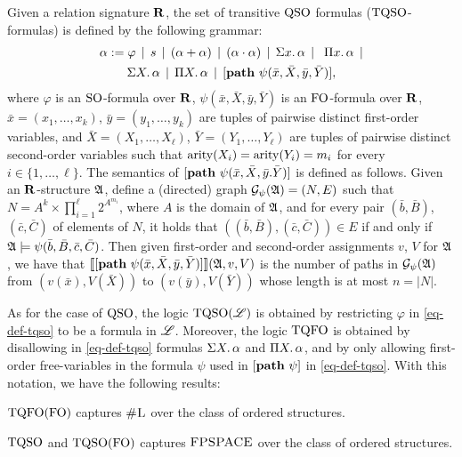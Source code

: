 Given a relation signature $\mathbf{R}$, the set of transitive ${\rm QSO}$ formulas (${\rm TQSO}$-formulas) is defined by the following grammar:
\begin{multline}
	\label{eq-def-tqso}
	\alpha := \varphi \, \mid \, s \, \mid \, (\alpha \add \alpha) \, \mid\, (\alpha \mult \alpha) \, \mid \, 
	\sa{x} \alpha \, \mid\, \
	\pa{x} \alpha \, \mid \\ 
	\sa{X} \alpha \, \mid \, \pa{X} \alpha \, \mid \, [\pth \psi(\bar{x}, \bar{X},\bar{y}, \bar{Y})],
\end{multline}
where $\varphi$ is an ${\rm SO}$-formula over $\mathbf{R}$, $\psi(\bar{x},\bar{X},\bar{y},\bar{Y})$ is an ${\rm FO}$-formula over $\mathbf{R}$, $\bar{x} = (x_1, \ldots, x_k)$, $\bar{y} = (y_1, \ldots, y_k)$ are tuples of pairwise distinct first-order variables, and $\bar{X} = (X_1, \ldots, X_\ell)$, $\bar{Y} = (Y_1, \ldots, Y_\ell)$ are tuples of pairwise distinct second-order variables such that ${\rm arity}(X_i) = {\rm arity}(Y_i) = m_i$ for every $i \in \{1, \ldots, \ell\}$. The semantics of $[{\bf path} \,\, \psi(\bar{x},\bar{X},\bar{y}.\bar{Y})]$ is defined as follows. Given an $\mathbf{R}$-structure $\mathfrak{A}$, define a (directed) graph $\cG_{\psi}(\A) = (N,E)$ such that $N = A^k \times \prod_{i=1}^\ell 2^{A^{m_i}}$, where $A$ is the domain of $\mathfrak{A}$, and for every pair $(\bar b, \bar B)$, $(\bar c, \bar C)$ of elements of $N$, it holds that $((\bar b, \bar B), (\bar c, \bar C)) \in E$ if and only if $\mathfrak{A} \models \psi(\bar b, \bar{B}, \bar c, \bar{C})$. Then given first-order and second-order assignments $v$, $V$ for $\mathfrak{A}$, we have that ${\llbracket{}{[{\bf path} \,\, \psi(\bar{x},\bar{X}, \bar{y}, \bar{Y})]}\rrbracket}(\mathfrak{A},v,V)$ is the number of paths in $\cG_\psi(\A)$ from $(v(\bar x), V(\bar X))$ to $(v(\bar y), V(\bar Y))$ whose length is at most $n = |N|$.

As for the case of ${\rm QSO}$, the logic ${\rm TQSO}(\mathscr{L})$ is obtained by restricting $\varphi$ in \eqref{eq-def-tqso} to be a formula in $\mathscr{L}$. Moreover, the logic ${\rm TQFO}$ is obtained by disallowing in \eqref{eq-def-tqso} formulas $\Sigma{X}.\, \alpha$ and $\Pi{X}.\, \alpha$, and by only allowing  first-order free-variables in the formula $\psi$ used in $[{\bf path} \,\, \psi]$ in \eqref{eq-def-tqso}. With this notation, we have the following results:


\begin{theorem} \label{tqfo-shl}
	${\rm TQFO}({\rm FO})$ captures $\text{\sc \#L}$ over the class of ordered structures.
\end{theorem}

\begin{theorem} \label{tqso-fo-fpsace}
	${\rm TQSO}$ and ${\rm TQSO}({\rm FO})$ captures $\text{\sc FPSPACE}$ over the class of ordered structures.
\end{theorem}

